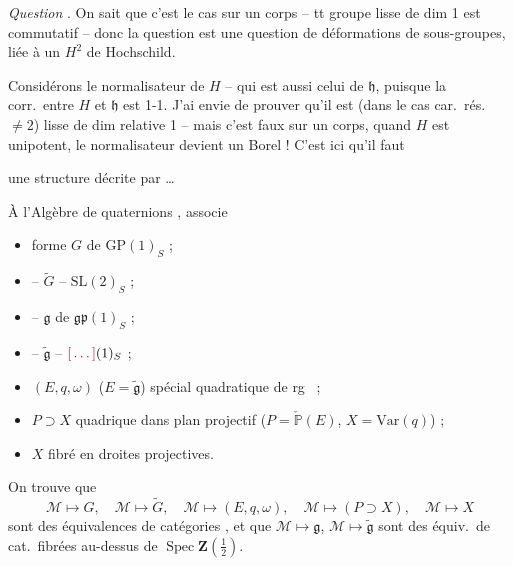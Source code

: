 \documentclass[11pt,a4paper]{article}
\begin{document}
\emph{Question } \add{\ill{}}. On sait que c'est le cas
sur un corps -- tt groupe lisse  de dim 1 est commutatif -- donc la
question est une question de déformations de sous-groupes, liée à un $H^2$ de
Hochschild.

Considérons le normalisateur de $H$ -- qui est aussi celui de $\mathfrak{h}$,
puisque la corr.\ entre $H$ et $\mathfrak{h}$ est 1-1. J'ai envie de prouver
qu'il est (dans le cas car.\ rés.\ $\neq 2$) lisse de dim relative 1 -- mais
c'est faux \struck{\ill{}} sur un corps, quand $H$ est unipotent, le normalisateur
devient un Borel ! C'est ici qu'il faut 

une structure décrite par \emph{} \ldots\ \struck{\ill{}}

À l'Algèbre de quaternions ,  associe
\begin{itemize}
  \item forme $G$ de $\mathrm{GP}(1)_S$ ;
  \item -- $\widetilde{G}$ -- $\mathrm{SL}(2)_S$ ;
  \item -- $\mathfrak{g}$ de $\mathfrak{gp}(1)_S$ ;
  \item -- $\widetilde{\mathfrak{g}}$ -- $\ill{}(1)_S$ ;
  \item $(E, q, \omega)$ ($E = \widetilde{\mathfrak{g}}$)  spécial quadratique de rg~ ;
  \item $P \supset X$ quadrique dans plan projectif ($P = \check{\mathbb{P}}(E)$, $X = \mathrm{Var}(q)$) ;
  \item $X$ fibré en droites projectives.
\end{itemize}

On trouve que
\[
  \mathcal{M} \mapsto G, \quad \mathcal{M} \mapsto \widetilde{G}, \quad
  \mathcal{M} \mapsto (E, q, \omega), \quad
  \mathcal{M} \mapsto (P \supset X), \quad \mathcal{M} \mapsto X
\]
sont des équivalences de catégories , et que
$\mathcal{M} \mapsto \mathfrak{g}$, $\mathcal{M} \mapsto \widetilde{\mathfrak{g}}$
sont des équiv.\ de cat.\ fibrées au-dessus de $\operatorname{Spec} \mathbf{Z}(\tfrac{1}{2})$.
\end{document}
